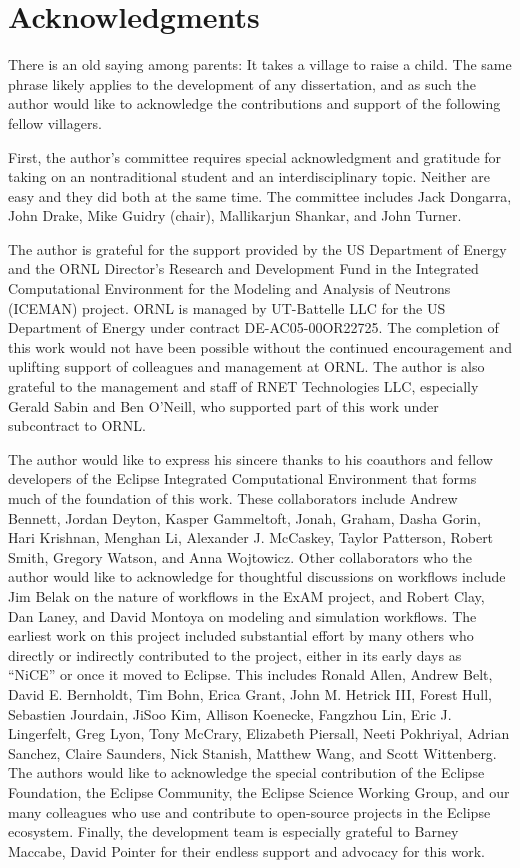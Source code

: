 \chapter*{Acknowledgments}

There is an old saying among parents: It takes a village to raise a child. The
same phrase likely applies to the development of any dissertation, and as such
the author would like to acknowledge the contributions and support of the
following fellow villagers.

First, the author's committee requires special acknowledgment and gratitude
for taking on an nontraditional student and an interdisciplinary topic.
Neither are easy and they did both at the same time. The committee includes Jack
Dongarra, John Drake, Mike Guidry (chair), Mallikarjun Shankar, and John Turner. 

The author is grateful for the support provided by the US Department
of Energy and the ORNL Director’s Research and Development Fund in the
Integrated Computational Environment for the Modeling and Analysis of Neutrons
(ICEMAN) project. ORNL is managed by UT-Battelle LLC for the US Department of
Energy under contract DE-AC05-00OR22725. The completion of this work would not
have been possible without the continued encouragement and uplifting support of
colleagues and management at ORNL. The author is also grateful to the management
and staff of RNET Technologies LLC, especially Gerald Sabin and Ben O'Neill, who
supported part of this work under subcontract to ORNL.

The author would like to express his sincere thanks to his coauthors and
fellow developers of the Eclipse Integrated Computational Environment that
forms much of the foundation of this work. These collaborators include Andrew
Bennett, Jordan Deyton, Kasper Gammeltoft, Jonah, Graham, Dasha Gorin, Hari
Krishnan, Menghan Li, Alexander J. McCaskey, Taylor Patterson, Robert Smith,
Gregory Watson, and Anna Wojtowicz. Other collaborators who the author would
like to acknowledge for thoughtful discussions on workflows include Jim Belak on
the nature of workflows in the ExAM project, and Robert Clay, Dan Laney, and
David Montoya on modeling and simulation workflows. The earliest work on this
project included substantial effort by many others who directly or
indirectly contributed to the project, either in its early days as ``NiCE'' or
once it moved to Eclipse. This includes Ronald Allen, Andrew Belt, David E.
Bernholdt, Tim Bohn, Erica Grant, John M. Hetrick III, Forest Hull, Sebastien
Jourdain, JiSoo Kim, Allison Koenecke, Fangzhou Lin, Eric J. Lingerfelt, Greg
Lyon, Tony McCrary, Elizabeth Piersall, Neeti Pokhriyal, Adrian Sanchez, Claire
Saunders, Nick Stanish, Matthew Wang, and Scott Wittenberg. The authors would
like to acknowledge the special contribution of the Eclipse Foundation, the
Eclipse Community, the Eclipse Science Working Group, and our many colleagues
who use and contribute to open-source projects in the Eclipse ecosystem.
Finally, the development team is especially grateful to Barney Maccabe, David
Pointer for their endless support and advocacy for this work.

